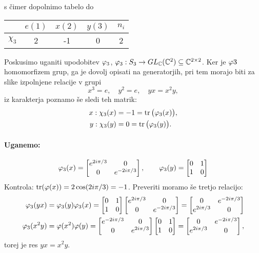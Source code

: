 \begin{zgled}
\[	\]
	s \v cimer dopolnimo tabelo do
	\begin{table}[H]\centering
		\begin{tabular}{c | c c c | c}
			& $e (1)$ & $x (2)$ & $y (3)$ & $n_i$ \\
			\hline
			$\chi_3$ & 2 &-1 & 0 & 2 \\
		\end{tabular}
		\label{karakterji}
	\end{table}
	Poskusimo uganiti upodobitev $\varphi_3$, $\varphi_3 : S_3 \to GL_{\mathbb{C}}(\mathbb{C}^2) \subseteq \mathbb{C}^{2 \times 2}$. Ker je $\varphi3$ homomorfizem
	grup, ga je dovolj opisati na generatorjih, pri tem morajo biti za slike izpolnjene relacije v grupi
	\[
		x^3 = e,\quad y^2 =e,\quad yx = x^2y,
	\]
	iz karakterja poznamo \v se sledi teh matrik:
	\begin{align*}
		x : \chi_3 (x) &= -1 = \operatorname{tr}\big(\varphi_3(x)\big), \\
		y : \chi_3 (y) &= 0 = \operatorname{tr}\big(\varphi_3(y)\big).
	\end{align*}
	\paragraph{Uganemo:}
	\[
		\varphi_3(x) = \begin{bmatrix}
			e^{2i\pi/3} & 0 \\
			0 & e^{-2i\pi/3}
		\end{bmatrix}, \qquad \varphi_3(y) = \begin{bmatrix}
		0 & 1 \\
		1 & 0
		\end{bmatrix}
	\]
	Kontrola: $\operatorname{tr}(\varphi(x)) = 2\cos(2i\pi/3) = -1$. Preveriti moramo \v se tretjo relacijo:
	\begin{align*}
		\varphi_3(yx) &= \varphi_3(y)\varphi_3(x) = \begin{bmatrix}0 & 1 \\ 1 & 0\end{bmatrix} \begin{bmatrix}
			e^{2i\pi/3} & 0 \\
			0 & e^{-2i\pi/3}
		\end{bmatrix} = \begin{bmatrix}
			0 & e^{-2i\pi/3} \\
			e^{2i\pi/3} & 0
		\end{bmatrix} \\
		\varphi_3(x^2y) &= \varphi(x^2)\varphi(y) = \begin{bmatrix}
			e^{-2i\pi/3} & 0 \\
			0 & e^{2i\pi/3}
		\end{bmatrix} \begin{bmatrix} 0 & 1 \\ 1 & 0 \end{bmatrix} = \begin{bmatrix}
			0 & e^{-2i\pi/3} \\
			e^{2i\pi/3} & 0
		\end{bmatrix},
	\end{align*}
	torej je res $yx = x^2y$.
\end{zgled}

